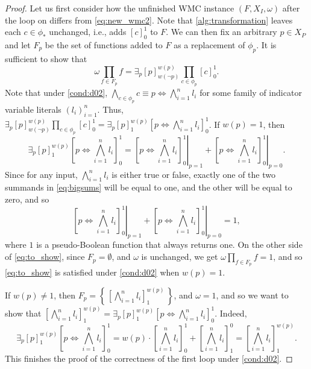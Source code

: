 \begin{proof}
  Let us first consider how the unfinished WMC instance $(F, X_I, \omega)$ after
  the loop on  differs from
  \cref{eq:new_wmc2}. Note that \cref{alg:transformation} leaves each
  $c \in \phi_*$ unchanged, i.e., adds ${[c]}_0^1$ to $F$. We can then fix an
  arbitrary $p \in X_P$ and let $F_p$ be the set of functions added to $F$ as a
  replacement of $\phi_p$. It is sufficient to show that
  \begin{equation} \label{eq:to_show}
    \omega \prod_{f \in F_p} f = \exists_p {[p]}_{w(\neg p)}^{w(p)} \prod_{c \in \phi_p} {[c]}_0^1.
  \end{equation}
  Note that under \cref{cond:d02},
  $\bigwedge_{c \in \phi_p} c \equiv p \Leftrightarrow \bigwedge_{i=1}^n l_i$
  for some family of indicator variable literals ${(l_i)}_{i=1}^n$. Thus,
  $\exists_p {[p]}_{w(\neg p)}^{w(p)} \prod_{c \in \phi_p} {[c]}_0^1 = \exists_p {[p]}_1^{w(p)} {\left[ p \Leftrightarrow \bigwedge_{i=1}^n l_i \right]}_0^1$.
  If $w(p) = 1$, then
  \begin{equation} \label{eq:bigsums}
    \exists_p {[p]}_1^{w(p)} {\left[ p \Leftrightarrow \bigwedge_{i=1}^n l_i \right]}_0^1 = \left.{\left[ p \Leftrightarrow \bigwedge_{i=1}^n l_i \right]}_0^1\right|_{p=1} + \left.{\left[ p \Leftrightarrow \bigwedge_{i=1}^n l_i \right]}_0^1\right|_{p=0}.
  \end{equation}
  Since for any input, $\bigwedge_{i=1}^n l_i$ is either true or false, exactly
  one of the two summands in \cref{eq:bigsums} will be equal to one, and the
  other will be equal to zero, and so
  \[
    \left.{\left[ p \Leftrightarrow \bigwedge_{i=1}^n l_i \right]}_0^1\right|_{p=1} + \left.{\left[ p \Leftrightarrow \bigwedge_{i=1}^n l_i \right]}_0^1\right|_{p=0} = 1,
  \]
  where $1$ is a pseudo-Boolean function that always returns one. On the other
  side of \cref{eq:to_show}, since $F_p = \emptyset$, and $\omega$ is unchanged,
  we get $\omega\prod_{f \in F_p} f = 1$, and so \cref{eq:to_show} is satisfied
  under \cref{cond:d02} when $w(p) = 1$.

  If $w(p) \ne 1$, then
  $F_p = \left\{\, {\left[ \bigwedge_{i = 1}^n l_i \right]}_1^{w(p)} \,\right\}$, and
  $\omega = 1$, and so we want to show that
  ${\left[ \bigwedge_{i = 1}^n l_i \right]}_1^{w(p)} = \exists_p {[p]}_1^{w(p)} {\left[ p \Leftrightarrow \bigwedge_{i=1}^n l_i \right]}_0^1$.
  Indeed,
  \[
    \exists_p {[p]}_1^{w(p)} {\left[ p \Leftrightarrow \bigwedge_{i=1}^n l_i \right]}_0^1 = w(p) \cdot {\left[ \bigwedge_{i=1}^n l_i \right]}_0^1 + {\left[\bigwedge_{i=1}^n l_i \right]}_1^0 = {\left[ \bigwedge_{i=1}^n l_i \right]}_1^{w(p)}.
  \]
  This finishes the proof of the correctness of the first loop under
  \cref{cond:d02}.


\end{proof}
